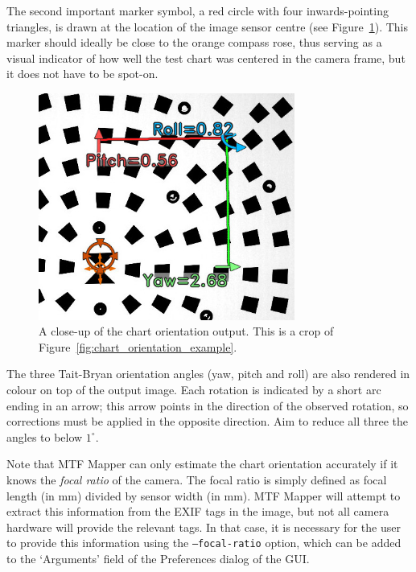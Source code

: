 \documentclass[a4paper]{article}
\begin{document}
The second important marker symbol, a red circle with four inwards-pointing
triangles, is drawn at the location of the image sensor centre (see
Figure~\ref{fig:chart_orientation_example_rep}). This marker should ideally
be close to the orange compass rose, thus serving as a visual indicator of
how well the test chart was centered in the camera frame, but it does not
have to be spot-on.


\begin{figure}[!ht]
\centering
\includegraphics[width=0.75\textwidth]{figures/orientation_example_closeup}
\caption{A close-up of the chart orientation output. This is a crop of
Figure~\ref{fig:chart_orientation_example}.}
\label{fig:chart_orientation_example_rep}
\end{figure}

The three Tait-Bryan orientation angles (yaw, pitch and roll) are also
rendered in colour on top of the output image. Each rotation is indicated by
a short arc ending in an arrow; this arrow points in the direction of the
observed rotation, so corrections must be applied in the opposite direction.
Aim to reduce all three the angles to below $1^\circ$.

Note that MTF Mapper can only estimate the chart orientation accurately if
it knows the \emph{focal ratio} of the camera. The focal ratio is simply
defined as focal length (in mm) divided by sensor width (in mm). MTF Mapper
will attempt to extract this information from the EXIF tags in the image,
but not all camera hardware will provide the relevant tags. In that case, it
is necessary for the user to provide this information using the
\texttt{--focal-ratio} option, which can be added to the `Arguments' field
of the \textsf{Preferences} dialog of the GUI.
\end{document}
